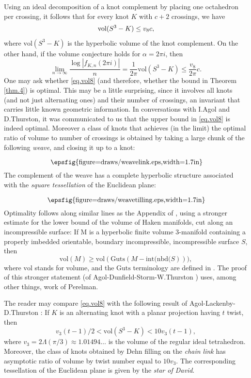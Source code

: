 \documentclass{amsart}
\theoremstyle{definition}
\def\printname#1{
    \if\draft y
        \smash{\makebox[0pt]{\hspace{-0.5in}
            \raisebox{8pt}{\tt\tiny #1}}}
    \fi
}
\newcommand{\psdraw}[2]
         {\begin{array}{c} \hspace{-1.3mm}
    \raisebox{-4pt}{\epsfig{figure=draws/#1.eps,width=#2}}
    \hspace{-1.9mm}\end{array}}
\def\lbl#1{\label{#1}\printname{#1}}
\def\a{\alpha}
\def\La{\Lambda}
\def\vol{\mathrm{vol}}
\begin{document}
Using an ideal decomposition of a knot complement by placing one octahedron
per crossing, it follows that for every knot $K$ with $c+2$ crossings, we have
\begin{equation}
\lbl{eq.vol8}
\vol(S^3-K) \leq v_8 c,
\end{equation}
where $\vol(S^3-K)$ is the hyperbolic volume of the knot complement.
On the other hand, if the volume conjecture holds for $\a=2 \pi i$, then
$$
 \lim_{n \to \infty} \frac{\log|f_{K,n}(2\pi i)|}{n}
= \frac{1}{2 \pi} \vol(S^3-K) \leq \frac{v_8}{2 \pi} c.
$$
One may ask whether \eqref{eq.vol8} (and therefore, whether the
bound in Theorem \ref{thm.4}) is optimal. This may be a little surprising,
since it involves all knots (and not just alternating ones)
and their number of crossings, an invariant that carries little known
geometric information.
In conversations with I.Agol and D.Thurston, it was communicated to us
that the upper bound in \eqref{eq.vol8} is indeed optimal. Moreover a class
of knots that achieves (in the limit) the optimal ratio of volume
to number of crossings is obtained by
taking a large chunk of the following {\em weave}, and closing it up to a knot:
$$
\psdraw{weavelink}{1.7in}
$$
The complement of the weave has a complete hyperbolic structure associated
with the {\em square tessellation} of the Euclidean plane:
$$
\psdraw{weavetilling}{1.7in}
$$
Optimality follows along similar lines as the Appendix of \cite{La},
using a stronger estimate for the lower bound of the volume of Haken
manifolds, cut along an incompressible surface: If M is a hyperbolic
finite volume 3-manifold containing a properly imbedded orientable,
boundary incompressible, incompressible surface $S$, then
$$
\vol(M) \geq \vol(\mathrm{Guts}(M-\mathrm{int(nbd(}S))),
$$
where $\vol$ stands for volume, and the $\mathrm{Guts}$ terminology
are defined in \cite{Ag}. The proof of this
 stronger statement (of
Agol-Dunfield-Storm-W.Thurston \cite{ADST}) uses, among other
things, work of Perelman.




The reader may compare \eqref{eq.vol8} with the following result of
Agol-Lackenby-D.Thurston \cite{La}:  If $K$ is an alternating knot
with  a planar projection having $t$ twist, then
$$
v_3 (t-1)/2 <  \vol(S^3-K) < 10 v_3 (t-1),
$$
where $v_3=2 \La(\pi/3)\approx 1.01494\dots$ is the volume of the regular ideal
tetrahedron.
Moreover, the class of knots obtained by Dehn filling on the {\em chain link}
has asymptotic ratio of volume by twist number equal to $10 v_3$.
The corresponding tessellation of the Euclidean plane is given by the
{\em star of David}.
\end{document}
